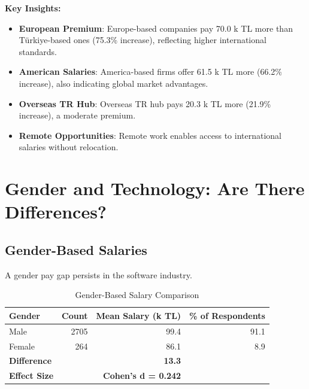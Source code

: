 \documentclass[12pt,a4paper]{article}
\begin{document}
\textbf{Key Insights:}
\begin{itemize}
	\item \textbf{European Premium}: Europe-based companies pay 70.0 k TL more than Türkiye-based ones (75.3\% increase), reflecting higher international standards.
	\item \textbf{American Salaries}: America-based firms offer 61.5 k TL more (66.2\% increase), also indicating global market advantages.
	\item \textbf{Overseas TR Hub}: Overseas TR hub pays 20.3 k TL more (21.9\% increase), a moderate premium.
	\item \textbf{Remote Opportunities}: Remote work enables access to international salaries without relocation.
\end{itemize}

\section{Gender and Technology: Are There Differences?}

\subsection{Gender-Based Salaries}
A gender pay gap persists in the software industry.

\begin{table}[H]
	\centering
	\small
	\begin{tabular}{lrrr}
		\toprule
		\textbf{Gender}     & \textbf{Count} & \textbf{Mean Salary (k TL)} & \textbf{\% of Respondents} \\
		\midrule
		Male                & 2705           & 99.4                        & 91.1                       \\
		Female              & 264            & 86.1                        & 8.9                        \\
		\midrule
		\textbf{Difference} &                & \textbf{13.3}               &                            \\
		\textbf{Effect Size} & & \textbf{Cohen's d = 0.242} \\
		\bottomrule
	\end{tabular}
	\caption{Gender-Based Salary Comparison}
\end{table}
\end{document}
